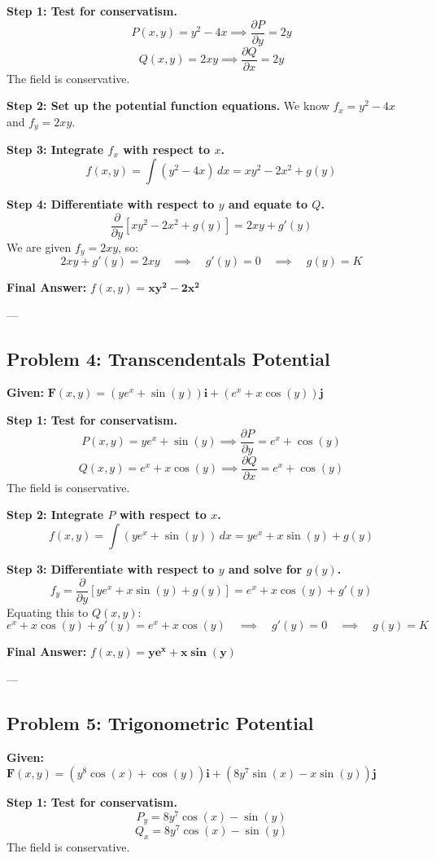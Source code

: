 \documentclass[12pt]{article}
\begin{document}
\textbf{Step 1: Test for conservatism.}
\[
P(x,y) = y^2 - 4x \implies \frac{\partial P}{\partial y} = 2y
\]
\[
Q(x,y) = 2xy \implies \frac{\partial Q}{\partial x} = 2y
\]
The field is conservative.

\textbf{Step 2: Set up the potential function equations.}
We know $f_x = y^2 - 4x$ and $f_y = 2xy$.

\textbf{Step 3: Integrate $f_x$ with respect to $x$.}
\[
f(x, y) = \int (y^2 - 4x) \, dx = xy^2 - 2x^2 + g(y)
\]

\textbf{Step 4: Differentiate with respect to $y$ and equate to $Q$.}
\[
\frac{\partial}{\partial y}[xy^2 - 2x^2 + g(y)] = 2xy + g'(y)
\]
We are given $f_y = 2xy$, so:
\[
2xy + g'(y) = 2xy \quad \implies \quad g'(y) = 0 \quad \implies \quad g(y) = K
\]

\textbf{Final Answer:} $f(x, y) = \mathbf{xy^2 - 2x^2}$

---

\subsection{Problem 4: Transcendentals Potential}
\textbf{Given:} $\mathbf{F}(x, y) = (ye^x + \sin(y))\mathbf{i} + (e^x + x\cos(y))\mathbf{j}$

\textbf{Step 1: Test for conservatism.}
\[
P(x,y) = ye^x + \sin(y) \implies \frac{\partial P}{\partial y} = e^x + \cos(y)
\]
\[
Q(x,y) = e^x + x\cos(y) \implies \frac{\partial Q}{\partial x} = e^x + \cos(y)
\]
The field is conservative.

\textbf{Step 2: Integrate $P$ with respect to $x$.}
\[
f(x, y) = \int (ye^x + \sin(y)) \, dx = ye^x + x\sin(y) + g(y)
\]

\textbf{Step 3: Differentiate with respect to $y$ and solve for $g(y)$.}
\[
f_y = \frac{\partial}{\partial y}[ye^x + x\sin(y) + g(y)] = e^x + x\cos(y) + g'(y)
\]
Equating this to $Q(x, y)$:
\[
e^x + x\cos(y) + g'(y) = e^x + x\cos(y) \quad \implies \quad g'(y) = 0 \quad \implies \quad g(y) = K
\]

\textbf{Final Answer:} $f(x, y) = \mathbf{ye^x + x\sin(y)}$

---

\subsection{Problem 5: Trigonometric Potential}
\textbf{Given:} $\mathbf{F}(x, y) = (y^8\cos(x) + \cos(y))\mathbf{i} + (8y^7\sin(x) - x\sin(y))\mathbf{j}$

\textbf{Step 1: Test for conservatism.}
\[
P_y = 8y^7\cos(x) - \sin(y)
\]
\[
Q_x = 8y^7\cos(x) - \sin(y)
\]
The field is conservative.
\end{document}

